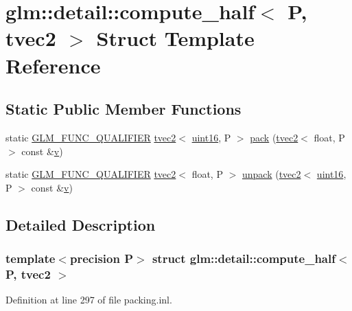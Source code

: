 \hypertarget{structglm_1_1detail_1_1compute__half_3_01_p_00_01tvec2_01_4}{}\section{glm\+::detail\+::compute\+\_\+half$<$ P, tvec2 $>$ Struct Template Reference}
\label{structglm_1_1detail_1_1compute__half_3_01_p_00_01tvec2_01_4}
\subsection*{Static Public Member Functions}
\begin{DoxyCompactItemize}
\item 
static \mbox{\hyperlink{setup_8hpp_a33fdea6f91c5f834105f7415e2a64407}{G\+L\+M\+\_\+\+F\+U\+N\+C\+\_\+\+Q\+U\+A\+L\+I\+F\+I\+ER}} \mbox{\hyperlink{structglm_1_1tvec2}{tvec2}}$<$ \mbox{\hyperlink{namespaceglm_1_1detail_a47b2a7d006d187338e8031a352d1ce56}{uint16}}, P $>$ \mbox{\hyperlink{structglm_1_1detail_1_1compute__half_3_01_p_00_01tvec2_01_4_ad4f9aae8c371dfc6bb0c566beac0d172}{pack}} (\mbox{\hyperlink{structglm_1_1tvec2}{tvec2}}$<$ float, P $>$ const \&\mbox{\hyperlink{glad_8h_a14cfbe2fc2234f5504618905b69d1e06}{v}})
\item 
static \mbox{\hyperlink{setup_8hpp_a33fdea6f91c5f834105f7415e2a64407}{G\+L\+M\+\_\+\+F\+U\+N\+C\+\_\+\+Q\+U\+A\+L\+I\+F\+I\+ER}} \mbox{\hyperlink{structglm_1_1tvec2}{tvec2}}$<$ float, P $>$ \mbox{\hyperlink{structglm_1_1detail_1_1compute__half_3_01_p_00_01tvec2_01_4_a6458eaa1f6f937b70380469ad6c17f5e}{unpack}} (\mbox{\hyperlink{structglm_1_1tvec2}{tvec2}}$<$ \mbox{\hyperlink{namespaceglm_1_1detail_a47b2a7d006d187338e8031a352d1ce56}{uint16}}, P $>$ const \&\mbox{\hyperlink{glad_8h_a14cfbe2fc2234f5504618905b69d1e06}{v}})
\end{DoxyCompactItemize}


\subsection{Detailed Description}
\subsubsection*{template$<$precision P$>$\newline
struct glm\+::detail\+::compute\+\_\+half$<$ P, tvec2 $>$}



Definition at line 297 of file packing.\+inl.



